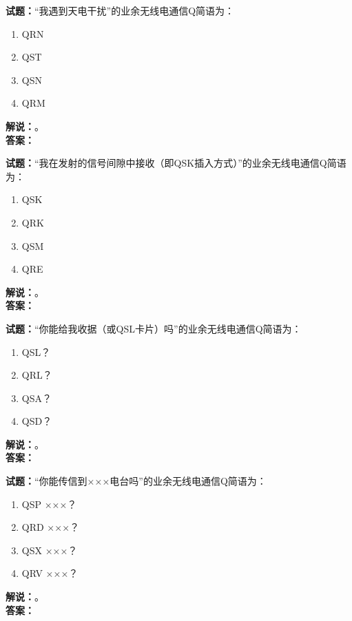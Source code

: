 \documentclass{ctexbook}
\begin{document}
\vspace{\baselineskip}

\noindent\textbf{试题：}“我遇到天电干扰”的业余无线电通信Q简语为：
\begin{enumerate}[leftmargin=3em]
  \item QRN
  \item QST
  \item QSN
  \item QRM
\end{enumerate}
\noindent\textbf{解说：}\textbf{}。\\\noindent\textbf{答案：}

\vspace{\baselineskip}

\noindent\textbf{试题：}“我在发射的信号间隙中接收（即QSK插入方式）”的业余无线电通信Q简语为：
\begin{enumerate}[leftmargin=3em]
  \item QSK
  \item QRK
  \item QSM
  \item QRE
\end{enumerate}
\noindent\textbf{解说：}\textbf{}。\\\noindent\textbf{答案：}

\vspace{\baselineskip}

\noindent\textbf{试题：}“你能给我收据（或QSL卡片）吗”的业余无线电通信Q简语为：
\begin{enumerate}[leftmargin=3em]
  \item QSL？
  \item QRL？
  \item QSA？
  \item QSD？
\end{enumerate}
\noindent\textbf{解说：}\textbf{}。\\\noindent\textbf{答案：}

\vspace{\baselineskip}

\noindent\textbf{试题：}“你能传信到×××电台吗”的业余无线电通信Q简语为：
\begin{enumerate}[leftmargin=3em]
  \item QSP ×××？
  \item QRD ×××？
  \item QSX ×××？
  \item QRV ×××？
\end{enumerate}
\noindent\textbf{解说：}\textbf{}。\\\noindent\textbf{答案：}
\end{document}
